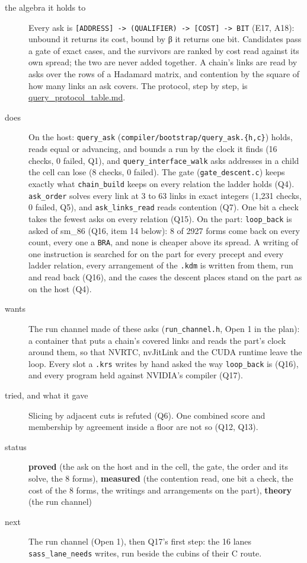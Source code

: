\begin{description}
\item[{the algebra it holds to}] Every ask is \texttt{[ADDRESS] -\allowbreak{}> (QUALIFIER) -\allowbreak{}> [COST] -\allowbreak{}> BIT} (E17, A18): unbound it returns its cost, bound by β it returns one bit. Candidates pass a gate of exact cases, and the survivors are ranked by cost read against its own spread; the two are never added together. A chain's links are read by asks over the rows of a Hadamard matrix, and contention by the square of how many links an ask covers. The protocol, step by step, is \hyperref[chap:query-protocol-table]{query\_\allowbreak{}protocol\_\allowbreak{}table.md}.
\item[{does}] On the host: \texttt{query\_\allowbreak{}ask} (\texttt{compiler/\allowbreak{}bootstrap/\allowbreak{}query\_\allowbreak{}ask.\allowbreak{}\{h,c\}}) holds, reads equal or advancing, and bounds a run by the clock it finds (16 checks, 0 failed, Q1), and \texttt{query\_\allowbreak{}interface\_\allowbreak{}walk} asks addresses in a child the cell can lose (8 checks, 0 failed). The gate (\texttt{gate\_\allowbreak{}descent.\allowbreak{}c}) keeps exactly what \texttt{chain\_\allowbreak{}build} keeps on every relation the ladder holds (Q4). \texttt{ask\_\allowbreak{}order} solves every link at 3 to 63 links in exact integers (1,231 checks, 0 failed, Q5), and \texttt{ask\_\allowbreak{}links\_\allowbreak{}read} reads contention (Q7). One bit a check takes the fewest asks on every relation (Q15). On the part: \texttt{loop\_\allowbreak{}back} is asked of sm\_\allowbreak{}86 (Q16, item 14 below): 8 of 2927 forms come back on every count, every one a \texttt{BRA}, and none is cheaper above its spread. A writing of one instruction is searched for on the part for every precept and every ladder relation, every arrangement of the \texttt{.\allowbreak{}kdm} is written from them, run and read back (Q16), and the cases the descent places stand on the part as on the host (Q4).
\item[{wants}] The run channel made of these asks (\texttt{run\_\allowbreak{}channel.\allowbreak{}h}, Open 1 in the plan): a container that puts a chain's covered links and reads the part's clock around them, so that NVRTC, nvJitLink and the CUDA runtime leave the loop. Every slot a \texttt{.\allowbreak{}krs} writes by hand asked the way \texttt{loop\_\allowbreak{}back} is (Q16), and every program held against NVIDIA's compiler (Q17).
\item[{tried, and what it gave}] Slicing by adjacent cuts is refuted (Q6). One combined score and membership by agreement inside a floor are not so (Q12, Q13).
\item[{status}] \textbf{proved} (the ask on the host and in the cell, the gate, the order and its solve, the 8 forms), \textbf{measured} (the contention read, one bit a check, the cost of the 8 forms, the writings and arrangements on the part), \textbf{theory} (the run channel)
\item[{next}] The run channel (Open 1), then Q17's first step: the 16 lanes \texttt{sass\_\allowbreak{}lane\_\allowbreak{}needs} writes, run beside the cubins of their C route.
\end{description}

